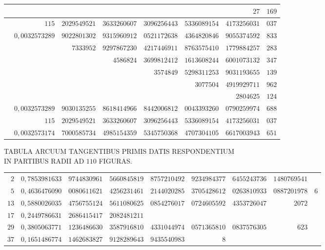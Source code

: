 \begin{longtable}{@{}rrrrrrrr@{}}
 &  &  &  &  &  & $27$ & $169$\\
\hline
 & $115$ & $2029549521$ & $3633260607$ & $3096256443$ & $5336089154$ & $4173256031$ & $037$\\
\hline
 & $0{,}0032573289$ & $9022801302$ & $9315960912$ & $0521172638$ & $4364820846$ & $9055374592$ & $833$\\
 &  & $7333952$ & $9297867230$ & $4217446911$ & $8763575410$ & $1779884257$ & $283$\\
 &  &  & $4586824$ & $3699812412$ & $1613608244$ & $6001073132$ & $347$\\
 &  &  &  & $3574849$ & $5298311253$ & $9031193655$ & $139$\\
 &  &  &  &  & $3077504$ & $4919929711$ & $962$\\
 &  &  &  &  &  & $2804625$ & $124$\\
\hline
 & $0{,}0032573289$ & $9030135255$ & $8618414966$ & $8442006812$ & $0043393260$ & $0790259974$ & $688$\\
 & $115$ & $2029549521$ & $3633260607$ & $3096256443$ & $5336089154$ & $4173256031$ & $037$\\
\hline
 & $0{,}0032573174$ & $7000585734$ & $4985154359$ & $5345750368$ & $4707304105$ & $6617003943$ & $651$\\
\end{longtable}\endgroup
\par{}
\begin{center}\small TABULA ARCUUM TANGENTIBUS PRIMIS DATIS RESPONDENTIUM\\
IN PARTIBUS RADII AD $110$ FIGURAS.\end{center}
\begingroup\fontsize{8.5}{11}\selectfont\setlength{\tabcolsep}{1.5pt}
\begin{longtable}{@{}r|rrrrrrrr@{}}
\hline
$2$ & $0{,}7853981633$ & $9744830961$ & $5660845819$ & $8757210492$ & $9234984377$ & $6455243736$ & $1480769541$ & \\
$5$ & $0{,}4636476090$ & $0080611621$ & $4256231461$ & $2144020285$ & $3705428612$ & $0263810933$ & $0887201978$ & $6$\\
$13$ & $0{,}5880026035$ & $4756755124$ & $5611080625$ & $0854276017$ & $0724605592$ & $4353726047$ & $2072$ & \\
$17$ & $0{,}2449786631$ & $2686415417$ & $2082481211$ &  &  &  &  & \\
$29$ & $0{,}3805063771$ & $1236486630$ & $3587916810$ & $4331044974$ & $0571365810$ & $0837576305$ & $623$ & \\
$37$ & $0{,}1651486774$ & $1462683827$ & $9128289643$ & $9435540983$ & $8$ &  &  & \\
\end{longtable}\endgroup
